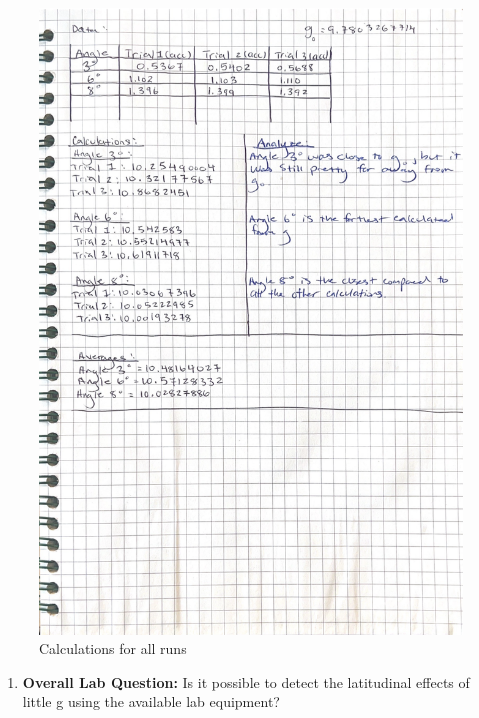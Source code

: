 \documentclass[idxtotoc,hyperref,openany]{labbook} %
\begin{document}
\begin{figure}[H] %
\begin{center}
\includegraphics[width=1\linewidth]{images/Lab.04/LocalGCalculations2.png}
\end{center}
\caption{Calculations for all runs}
\label{fig:Local G Calculations2}
\end{figure}


\begin{enumerate}
    \item \textbf{Overall Lab Question:} Is it possible to detect the latitudinal effects of little g using the available lab equipment?
\end{enumerate}
\end{document}
